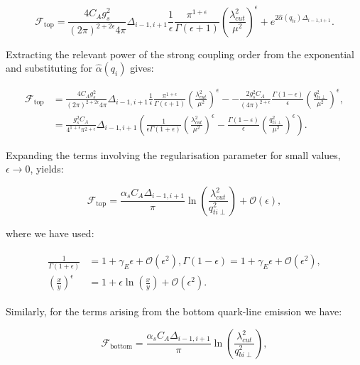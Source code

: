 		\begin{equation}
			\mathcal{F}_{\text{top}} = \frac{4C_Ag_s^2}{(2\pi)^{2+2\epsilon}4\pi}\Delta_{i-1, i+1}
			\frac{1}{\epsilon}\frac{\pi^{1+\epsilon}}
			{\Gamma(\epsilon+1)}\left(\frac{\lambda_{cut}^2}{\mu^2}\right)^\epsilon +
			e^{2\hat{\alpha}(q_{ti})\Delta_{i-1,i+1}}.
		\end{equation}

		Extracting the relevant power of the strong coupling order from the
		exponential and substituting for $\hat{\alpha}(q_i)$ gives:

		\begin{align}
			\mathcal{F}_{\text{top}} &= \frac{4C_Ag_s^2}{(2\pi)^{2+2\epsilon}4\pi}\Delta_{i-1, i+1}\frac{1}{\epsilon}\frac{\pi^{1+\epsilon}}
			{\Gamma(\epsilon+1)}\left(\frac{\lambda_{cut}^2}{\mu^2}\right)^\epsilon - -\frac{2g_s^2C_A}{(4\pi)^{2+\epsilon}}
			\frac{\Gamma(1-\epsilon)}{\epsilon}\left(\frac{q_{ti\perp}^2}{\mu^2}\right)^\epsilon, \\
			&= \frac{g_s^2C_A}{4^{1+\epsilon}\pi^{2+\epsilon}}\Delta_{i-1, i+1}\left(\frac{1}{\epsilon\Gamma(1+\epsilon)}
			\left(\frac{\lambda_{cut}^2}{\mu^2}\right)^\epsilon - \frac{\Gamma(1-\epsilon)}{\epsilon}
			\left(\frac{q_{ti\perp}^2}{\mu^2}\right)^\epsilon\right).
		\end{align}

		Expanding the terms involving the regularisation parameter for small values,
		$\epsilon\to0$, yields:

		\begin{equation}
			\mathcal{F}_{\text{top}} = \frac{\alpha_sC_A\Delta_{i-1, i+1}}{\pi}
			\ln\left(\frac{\lambda_{cut}^2}{q_{ti\perp}^2}\right) + \mathcal{O}(\epsilon),
		\end{equation}

		where we have used:

		\begin{align}
		\begin{split}
			\frac{1}{\Gamma(1+\epsilon)} &= 1 + \gamma_E\epsilon + \mathcal{O}(\epsilon^2),
			\Gamma(1-\epsilon) = 1 + \gamma_E\epsilon + \mathcal{O}(\epsilon^2),\\
			\left(\frac{x}{y}\right)^\epsilon &= 1 + \epsilon\ln\left(\frac{x}{y}\right) +
			\mathcal{O}(\epsilon^2).
		\end{split}
		\end{align}

		Similarly, for the terms arising from the bottom quark-line emission we have:

		\begin{equation}
		\mathcal{F}_{\text{bottom}} = \frac{\alpha_sC_A\Delta_{i-1, i+1}}{\pi}\ln\left(\frac{\lambda_{cut}^2}{q_{bi\perp}^2}\right),
		\end{equation}

